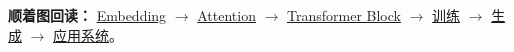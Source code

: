 \noindent
\textbf{顺着图回读：}
\hyperref[intro:embeddings]{Embedding} $\rightarrow$
\hyperref[intro:self-attention]{Attention} $\rightarrow$
\hyperref[intro:transformer-architecture]{Transformer Block} $\rightarrow$
\hyperref[intro:language-model-training]{训练} $\rightarrow$
\hyperref[intro:autoregressive-generation]{生成} $\rightarrow$
\hyperref[intro:rag]{应用系统}。


